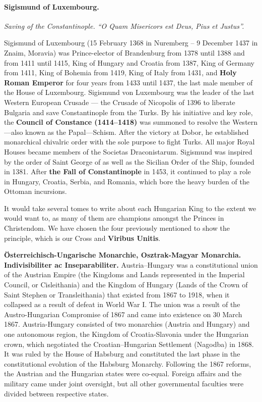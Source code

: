 \paragraph{Sigismund of Luxembourg.}


\emph{Saving of the Constantinople. ``O Quam Misericors est Deus, Pius et Justus''.}

Sigismund of Luxembourg (15 February 1368 in Nuremberg -- 9 December 1437 in Znaim, Moravia) was Prince-elector of Brandenburg from 1378 until 1388 and from 1411 until 1415, King of Hungary and Croatia from 1387, King of Germany from 1411, King of Bohemia from 1419, King of Italy from 1431, and \textbf{Holy Roman Emperor} for four years from 1433 until 1437, the last male member of the House of Luxembourg. Sigismund von Luxembourg was the leader of the last Western European Crusade --- the Crusade of Nicopolis of 1396 to liberate Bulgaria and save Constantinople from the Turks. By his initiative and key role, the \textbf{Council of Constance (1414--1418)} was summoned to resolve the Western---also known as the Papal---Schism. After the victory at Dobor, he established monarchical chivalric order with the sole purpose to fight Turks. All major Royal Houses became members of the Societas Draconistarum. Sigismund was inspired by the order of Saint George of as well as the Sicilian Order of the Ship, founded in 1381. After \textbf{the Fall of Constantinople} in 1453, it continued to play a role in Hungary, Croatia, Serbia, and Romania, which bore the heavy burden of the Ottoman incursions.

It would take several tomes to write about each Hungarian King to the extent we would want to, as many of them are champions amongst the Princes in Christendom. We have chosen the four previously mentioned to show the principle, which is our Cross and \textbf{Viribus Unitis}.

\textbf{Österreichisch-Ungarische Monarchie, Osztrak-Magyar Monarchia. Indivisibiliter ac Inseparabiliter.} Austria--Hungary was a constitutional union of the Austrian Empire (the Kingdoms and Lands represented in the Imperial Council, or Cisleithania) and the Kingdom of Hungary (Lands of the Crown of Saint Stephen or Transleithania) that existed from 1867 to 1918, when it collapsed as a result of defeat in World War I. The union was a result of the Austro-Hungarian Compromise of 1867 and came into existence on 30 March 1867. Austria-Hungary consisted of two monarchies (Austria and Hungary) and one autonomous region, the Kingdom of Croatia-Slavonia under the Hungarian crown, which negotiated the Croatian--Hungarian Settlement (Nagodba) in 1868. It was ruled by the House of Habsburg and constituted the last phase in the constitutional evolution of the Habsburg Monarchy. Following the 1867 reforms, the Austrian and the Hungarian states were co-equal. Foreign affairs and the military came under joint oversight, but all other governmental faculties were divided between respective states.

